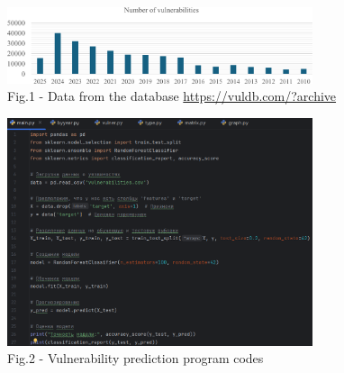 \begin{figure}[H]
	\centering
	\includegraphics[width=0.8\textwidth]{media/ict4/image3}
	\caption*{Fig.1 - Data from the database \url{https://vuldb.com/?archive}}
\end{figure}

\begin{figure}[H]
	\centering
	\includegraphics[width=0.8\textwidth]{media/ict2/image165}
	\caption*{Fig.2 - Vulnerability prediction program codes}
\end{figure}


